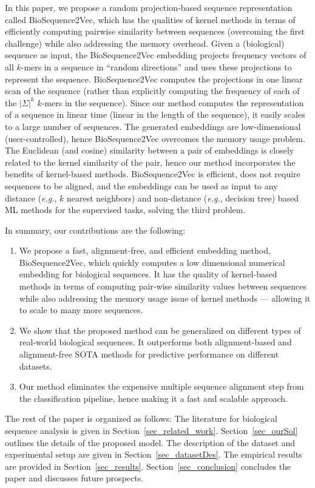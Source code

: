 \documentclass[runningheads]{llncs}
\newcommand{\eg}{\emph{e.g.}}
\begin{document}
In this paper, we propose a random projection-based sequence representation called  BioSequence2Vec, which has the qualities of kernel methods in terms of efficiently computing  pairwise similarity between sequences (overcoming the first challenge) while also addressing the memory overhead. Given a (biological) sequence as input, the BioSequence2Vec embedding projects frequency vectors of all $k$-mers in a sequence in ``random directions'' and uses these projections to represent the sequence. BioSequence2Vec computes the projections in one linear scan of the sequence (rather than explicitly computing the frequency of each of the $|\Sigma|^k$ $k$-mers in the sequence). Since our method computes the representation of a sequence in linear time (linear in the length of the sequence), it easily scales to a large number of sequences. The generated embeddings are low-dimensional (user-controlled), hence BioSequence2Vec overcomes the memory usage problem. The Euclidean (and cosine) similarity between a pair of embeddings is closely related to the kernel similarity of the pair, hence our method incorporates the benefits of kernel-based methods. BioSequence2Vec is efficient, does not require sequences to be aligned, and the embeddings can be used as input to any distance (\eg, $k$ nearest neighbors) and non-distance (\eg, decision tree) based ML methods for the supervised tasks, solving the third problem.

In summary, our contributions are the following:
\begin{enumerate}
\item We propose a fast, alignment-free, and efficient embedding
  method, BioSequence2Vec, which quickly computes a low
  dimensional numerical embedding for biological sequences. It has the
  quality of kernel-based methods in terms of computing pair-wise
  similarity values between sequences while also addressing the
  memory usage issue of kernel methods --- allowing it to scale to
  many more sequences.
\item We show that the proposed method can be generalized on
  different types of real-world biological sequences. It outperforms
  both alignment-based and alignment-free SOTA methods for
  predictive performance on different datasets.
\item Our method eliminates the expensive multiple sequence alignment step from the classification pipeline, hence making it a fast and scalable approach.
\end{enumerate}


The rest of the paper is organized as follows: The literature for biological sequence analysis is given in
Section~\ref{sec_related_work}. Section~\ref{sec_ourSol} outlines the details of the proposed model. The description of the dataset and experimental setup are given in
Section~\ref{sec_datasetDes}. The empirical results are provided in Section~\ref{sec_results}.
Section~\ref{sec_conclusion} concludes the paper and discusses future prospects.
\end{document}
